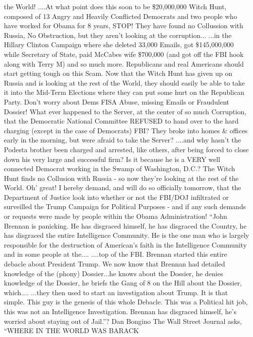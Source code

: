 the World! ....At what point does this soon to be \$20,000,000 Witch
Hunt, composed of 13 Angry and Heavily Conflicted Democrats and two
people who have worked for Obama for 8 years, STOP! They have found no
Collussion with Russia, No Obstruction, but they aren't looking at the
corruption... ...in the Hillary Clinton Campaign where she deleted
33,000 Emails, got \$145,000,000 while Secretary of State, paid McCabes
wife \$700,000 (and got off the FBI hook along with Terry M) and so much
more. Republicans and real Americans should start getting tough on this
Scam. Now that the Witch Hunt has given up on Russia and is looking at
the rest of the World, they should easily be able to take it into the
Mid-Term Elections where they can put some hurt on the Republican Party.
Don't worry about Dems FISA Abuse, missing Emails or Fraudulent Dossier!
What ever happened to the Server, at the center of so much Corruption,
that the Democratic National Committee REFUSED to hand over to the hard
charging (except in the case of Democrats) FBI? They broke into homes \&
offices early in the morning, but were afraid to take the Server?
....and why hasn't the Podesta brother been charged and arrested, like
others, after being forced to close down his very large and successful
firm? Is it because he is a VERY well connected Democrat working in the
Swamp of Washington, D.C.? The Witch Hunt finds no Collusion with Russia
- so now they're looking at the rest of the World. Oh' great! I hereby
demand, and will do so officially tomorrow, that the Department of
Justice look into whether or not the FBI/DOJ infiltrated or surveilled
the Trump Campaign for Political Purposes - and if any such demands or
requests were made by people within the Obama Administration! ``John
Brennan is panicking. He has disgraced himself, he has disgraced the
Country, he has disgraced the entire Intelligence Community. He is the
one man who is largely responsible for the destruction of American's
faith in the Intelligence Community and in some people at the....
....top of the FBI. Brennan started this entire debacle about President
Trump. We now know that Brennan had detailed knowledge of the (phony)
Dossier...he knows about the Dossier, he denies knowledge of the
Dossier, he briefs the Gang of 8 on the Hill about the Dossier,
which.... ...they then used to start an investigation about Trump. It is
that simple. This guy is the genesis of this whole Debacle. This was a
Political hit job, this was not an Intelligence Investigation. Brennan
has disgraced himself, he's worried about staying out of Jail.''? Dan
Bongino The Wall Street Journal asks, ``WHERE IN THE WORLD WAS BARACK
